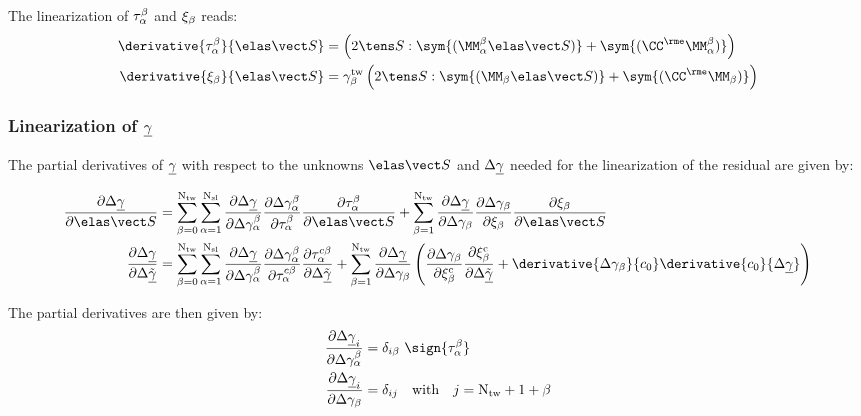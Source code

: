   The linearization of $\tau_{\alpha}^{\beta}$ and $\xi_\beta$ reads:
  \begin{align}
    \derivative{\tauab}{\SSe} &= \left(2 \SSSS:\sym{(\MMab \SSe)} + \sym{(\CCe \MMab)}\right) \\
    \derivative{\xib}{\SSe} &= \angleTwb \left(2 \SSSS:\sym{(\MMb \SSe)}  + \sym{(\CCe \MMb)}\right) \\
  \end{align}
  
  \subsubsection*{Linearization of $\underline{\gamma}$}
  
  The partial derivatives of $\underline{\gamma}$ with respect to the unknowns $\SSe$ and $\Delta\underline{\gamma}$ needed for the linearization of the residual are given by:
  
  \begin{align}
    \dDeltagammauDSSe &= \sumbO \sumaI \dDeltagammauDDeltagammaab \dDeltagammaabDtauab \dtauabDSSe + \sumbI \dDeltagammauDDeltagammab \dDeltagammabDxib \dxibDSSe \\
    \dDeltagammauDDeltagammau &= \sumbO \sumaI \dDeltagammauDDeltagammaab \dDeltagammaabDtauacb \dtauacbDDeltagammau + \sumbI \dDeltagammauDDeltagammab \left( \dDeltagammabDxibc \dxibcDDeltagammau + \derivative{\Delta\gammab}{c_0}\derivative{c_0}{\Delta\gammau} \right)
  \end{align}
  

  The partial derivatives are then given by:
  \begin{align}
    \frac{\partial \Delta\gammau_i}{\partial \Delta\gammaab} &= \delta_{i\beta} \ \sign{\tauab} \\
    \frac{\partial \Delta\gammau_i}{\partial \Delta\gammab} &= \delta_{ij} \quad \text{with} \quad j=\Ntw+1+\beta
  \end{align}
  
